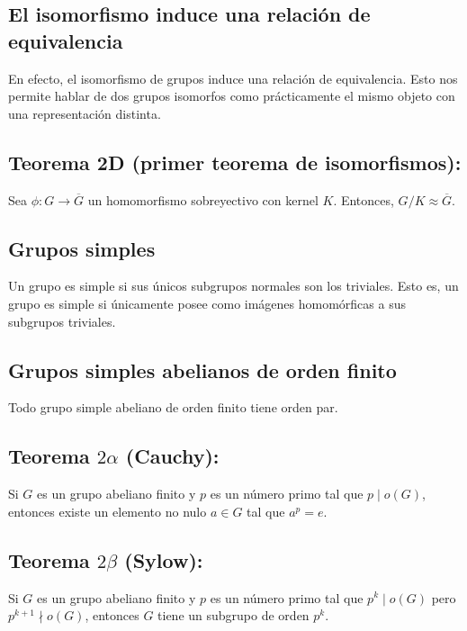 \documentclass{article}
\begin{document}
\subsection*{\color{purple} El isomorfismo induce una relación de equivalencia}

En efecto, el isomorfismo de grupos induce una relación de equivalencia. Esto nos permite hablar de dos grupos isomorfos como prácticamente el mismo objeto con una representación distinta.

\subsection*{\color{red} Teorema 2D (primer teorema de isomorfismos):}

Sea $\phi:G\to\overline{G}$ un homomorfismo sobreyectivo con kernel $K$. Entonces, $G/K\approx\overline{G}$.

\subsection*{\color{violet} Grupos simples}

Un grupo es simple si sus únicos subgrupos normales son los triviales.	 Esto es, un grupo es simple si únicamente posee como imágenes homomórficas a sus subgrupos triviales.

\subsection*{\color{purple} Grupos simples abelianos de orden finito}

Todo grupo simple abeliano de orden finito tiene orden par.

\subsection*{\color{red} Teorema $2\alpha$ (Cauchy):}

Si $G$ es un grupo abeliano finito y $p$ es un número primo tal que $p\mid o(G)$, entonces existe un elemento no nulo $a\in G$ tal que $a^p=e$.

\subsection*{\color{red} Teorema $2\beta$ (Sylow):}

Si $G$ es un grupo abeliano finito y $p$ es un número primo tal que $p^k\mid o(G)$ pero $p^{k+1}\nmid o(G)$, entonces $G$ tiene un subgrupo de orden $p^k$.
\end{document}
